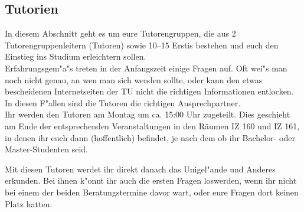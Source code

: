 \subsection{Tutorien}



In diesem Abschnitt geht es um eure Tutorengruppen, die aus 2 Tutorengruppenleitern (Tutoren) sowie 10--15 Erstis bestehen und euch den Einstieg ins Studium erleichtern sollen.\\
Erfahrungsgem"a"s treten in der Anfangszeit einige Fragen auf. Oft wei"s man noch nicht genau, an wen man sich wenden sollte, oder kann den etwas bescheidenen Internetseiten der TU nicht die richtigen Informationen entlocken. In diesen F"allen sind die Tutoren die richtigen Ansprechpartner.\\

Ihr werden den Tutoren am Montag um ca. 15:00 Uhr zugeteilt. Dies geschieht am Ende der entsprechenden Veranstaltungen in den Räumen IZ 160 und IZ 161, in denen ihr euch dann (hoffentlich) befindet, je nach dem ob ihr Bachelor- oder Master-Studenten seid.


Mit diesen Tutoren werdet ihr direkt danach das Unigel"ande und Anderes erkunden.
Bei ihnen k"onnt ihr auch die ersten Fragen loswerden, wenn 
ihr nicht bei einem der beiden Beratungstermine davor wart, oder eure Fragen dort keinen Platz hatten.


